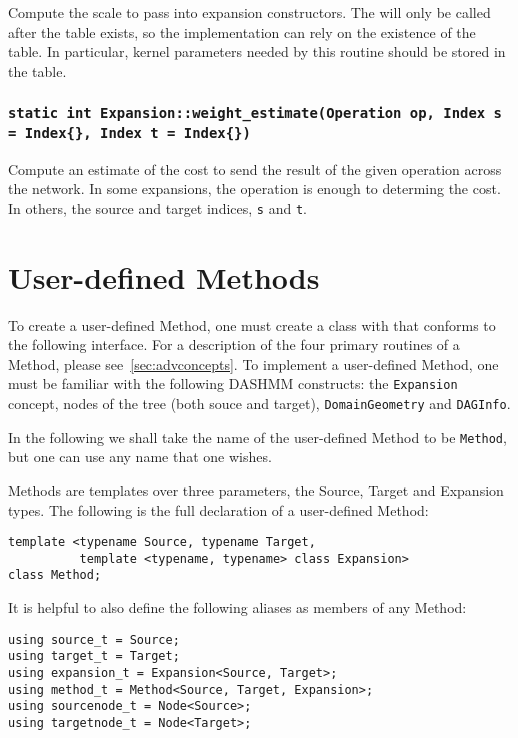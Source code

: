 Compute the scale to pass into expansion constructors. The will only be called
after the table exists, so the implementation can rely on the existence of the
table. In particular, kernel parameters needed by this routine should be
stored in the table.

\subsubsection{\texttt{static int Expansion::weight\_estimate(Operation op, Index s = Index\{\}, Index t = Index\{\})}}

Compute an estimate of the cost to send the result of the given operation
across the network. In some expansions, the operation is enough to determing
the cost. In others, the source and target indices, \texttt{s} and \texttt{t}.



\section{User-defined Methods}

To create a user-defined Method, one must create a class with that conforms
to the following interface. For a description of the four primary routines
of a Method, please see~\ref{sec:advconcepts}. To implement a user-defined
Method, one must be familiar with the following DASHMM constructs: the
\texttt{Expansion} concept, nodes of the tree (both souce and target),
\texttt{DomainGeometry} and \texttt{DAGInfo}.

In the following we shall take the name of the user-defined Method to be
\texttt{Method}, but one can use any name that one wishes.

Methods are templates over three parameters, the Source, Target and Expansion
types. The following is the full declaration of a user-defined Method:

\begin{verbatim}
template <typename Source, typename Target,
          template <typename, typename> class Expansion>
class Method;
\end{verbatim}

\noindent It is helpful to also define the following aliases as members of
any Method:

\begin{verbatim}
using source_t = Source;
using target_t = Target;
using expansion_t = Expansion<Source, Target>;
using method_t = Method<Source, Target, Expansion>;
using sourcenode_t = Node<Source>;
using targetnode_t = Node<Target>;
\end{verbatim}

